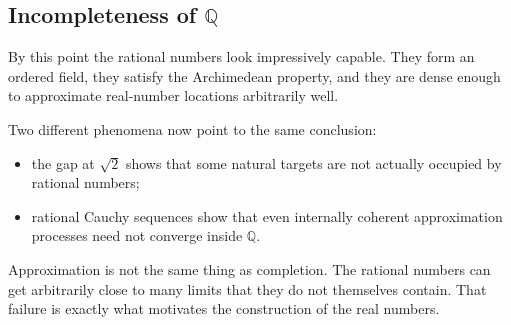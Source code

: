 
\subsection*{\texorpdfstring{Incompleteness of $\mathbb{Q}$}{Incompleteness of Q}}
\label{sec:incompleteness-q}

\begin{exposition}
By this point the rational numbers look impressively capable. They form
an ordered field, they satisfy the Archimedean property, and they are
dense enough to approximate real-number locations arbitrarily well.
\end{exposition}

\begin{remark*}
Two different phenomena now point to the same conclusion:
\begin{itemize}
  \item the gap at $\sqrt{2}$ shows that some natural targets are not
        actually occupied by rational numbers;
  \item rational Cauchy sequences show that even internally coherent
        approximation processes need not converge inside $\mathbb{Q}$.
\end{itemize}
\end{remark*}

\begin{remark*}
Approximation is not the same thing as completion. The rational numbers
can get arbitrarily close to many limits that they do not themselves
contain. That failure is exactly what motivates the construction of the
real numbers.
\end{remark*}
